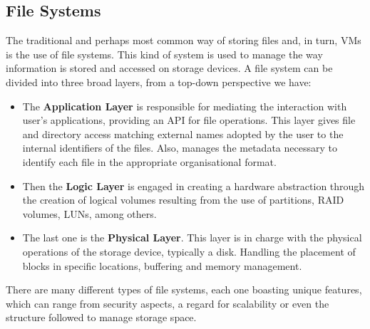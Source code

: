 \subsection{File Systems} %
\label{sub:file_systems}

The traditional and perhaps most common way of storing files and, in turn, VMs is the use of file systems.
This kind of system is used to manage the way information is stored and accessed on storage devices. A file system can be divided into three broad layers, from a top-down perspective we have:

\begin{itemize}
	\item The \textbf{Application Layer} is responsible for mediating the interaction with user's applications, providing an API for file operations. This layer gives file and directory access matching external names adopted by the user to the internal identifiers of the files. Also, manages the metadata necessary to identify each file in the appropriate organisational format.
	\item Then the \textbf{Logic Layer} is engaged in creating a hardware abstraction through the creation of logical volumes resulting from the use of partitions, RAID volumes, LUNs, among others.
	\item The last one is the \textbf{Physical Layer}. This layer is in charge with the physical operations of the storage device, typically a disk. Handling the placement of blocks in specific locations, buffering and memory management.
\end{itemize}


There are many different types of file systems, each one boasting unique features, which can range from security aspects, a regard for scalability or even the structure followed to manage storage space.

